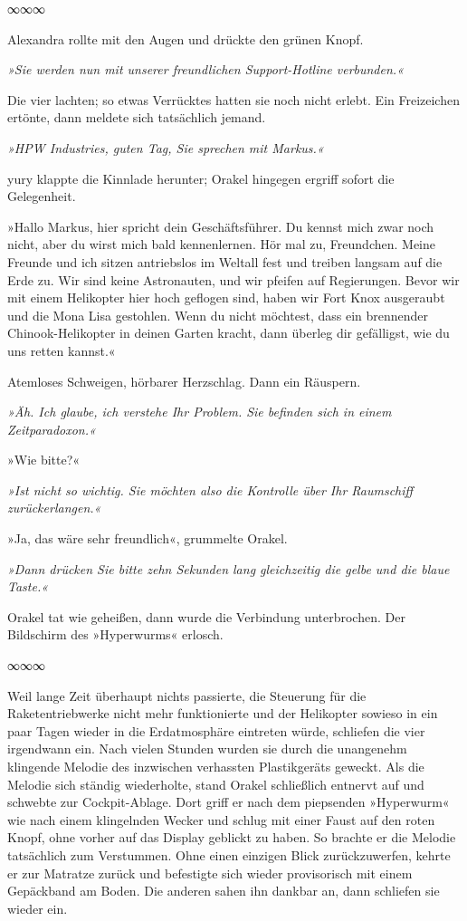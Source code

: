 \begin{center}
	∞∞∞
\end{center}

Alexandra rollte mit den Augen und drückte den grünen Knopf.

\textit{»Sie werden nun mit unserer freundlichen Support-Hotline verbunden.«}

Die vier lachten; so etwas Verrücktes hatten sie noch nicht erlebt. Ein Freizeichen ertönte, dann meldete sich tatsächlich jemand.

\textit{»HPW Industries, guten Tag, Sie sprechen mit Markus.«}

yury klappte die Kinnlade herunter; Orakel hingegen ergriff sofort die Gelegenheit.

»Hallo Markus, hier spricht dein Geschäftsführer. Du kennst mich zwar noch nicht, aber du wirst mich bald kennenlernen. Hör mal zu, Freundchen. Meine Freunde und ich sitzen antriebslos im Weltall fest und treiben langsam auf die Erde zu. Wir sind keine Astronauten, und wir pfeifen auf Regierungen. Bevor wir mit einem Helikopter hier hoch geflogen sind, haben wir Fort Knox ausgeraubt und die Mona Lisa gestohlen. Wenn du nicht möchtest, dass ein brennender Chinook-Helikopter in deinen Garten kracht, dann überleg dir gefälligst, wie du uns retten kannst.«

Atemloses Schweigen, hörbarer Herzschlag. Dann ein Räuspern.

\textit{»Äh. Ich glaube, ich verstehe Ihr Problem. Sie befinden sich in einem Zeitparadoxon.«}

»Wie bitte?«

\textit{»Ist nicht so wichtig. Sie möchten also die Kontrolle über Ihr Raumschiff zurückerlangen.«}

»Ja, das wäre sehr freundlich«, grummelte Orakel.

\textit{»Dann drücken Sie bitte zehn Sekunden lang gleichzeitig die gelbe und die blaue Taste.«}

Orakel tat wie geheißen, dann wurde die Verbindung unterbrochen. Der Bildschirm des »Hyperwurms« erlosch. 

\begin{center}
	∞∞∞
\end{center}

Weil lange Zeit überhaupt nichts passierte, die Steuerung für die Raketentriebwerke nicht mehr funktionierte und der Helikopter sowieso in ein paar Tagen wieder in die Erdatmosphäre eintreten würde, schliefen die vier irgendwann ein. Nach vielen Stunden wurden sie durch die unangenehm klingende Melodie des inzwischen verhassten Plastikgeräts geweckt. Als die Melodie sich ständig wiederholte, stand Orakel schließlich entnervt auf und schwebte zur Cockpit-Ablage. Dort griff er nach dem piepsenden »Hyperwurm« wie nach einem klingelnden Wecker und schlug mit einer Faust auf den roten Knopf, ohne vorher auf das Display geblickt zu haben. So brachte er die Melodie tatsächlich zum Verstummen. Ohne einen einzigen Blick zurückzuwerfen, kehrte er zur Matratze zurück und befestigte sich wieder provisorisch mit einem Gepäckband am Boden. Die anderen sahen ihn dankbar an, dann schliefen sie wieder ein.

